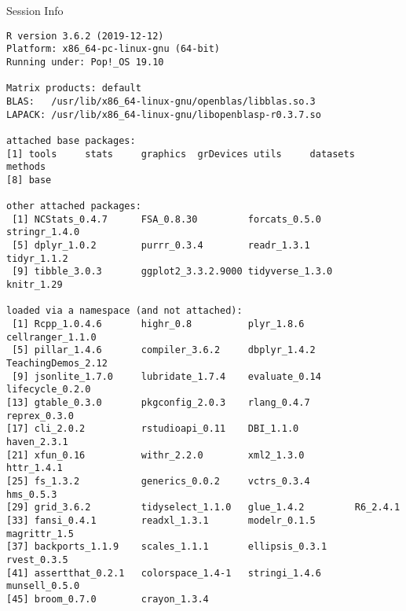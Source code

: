 \documentclass[10pt]{beamer}\usepackage[]{graphicx}\usepackage[]{color}
\makeatletter
\newenvironment{kframe}{%
 \def\at@end@of@kframe{}%
 \ifinner\ifhmode%
  \def\at@end@of@kframe{\end{minipage}}%
  \begin{minipage}{\columnwidth}%
 \fi\fi%
 \def\FrameCommand##1{\hskip\@totalleftmargin \hskip-\fboxsep
 \colorbox{shadecolor}{##1}\hskip-\fboxsep
     \hskip-\linewidth \hskip-\@totalleftmargin \hskip\columnwidth}%
 \MakeFramed {\advance\hsize-\width
   \@totalleftmargin\z@ \linewidth\hsize
   \@setminipage}}%
 {\par\unskip\endMakeFramed%
 \at@end@of@kframe}
\newenvironment{knitrout}{}{} %
\makeatother
\begin{document}
	
	
	\begin{frame}[fragile]{Session Info}
		\tiny
		
\begin{knitrout}\tiny
{}\color{fgcolor}\begin{kframe}
\begin{verbatim}
R version 3.6.2 (2019-12-12)
Platform: x86_64-pc-linux-gnu (64-bit)
Running under: Pop!_OS 19.10

Matrix products: default
BLAS:   /usr/lib/x86_64-linux-gnu/openblas/libblas.so.3
LAPACK: /usr/lib/x86_64-linux-gnu/libopenblasp-r0.3.7.so

attached base packages:
[1] tools     stats     graphics  grDevices utils     datasets  methods  
[8] base     

other attached packages:
 [1] NCStats_0.4.7      FSA_0.8.30         forcats_0.5.0      stringr_1.4.0     
 [5] dplyr_1.0.2        purrr_0.3.4        readr_1.3.1        tidyr_1.1.2       
 [9] tibble_3.0.3       ggplot2_3.3.2.9000 tidyverse_1.3.0    knitr_1.29        

loaded via a namespace (and not attached):
 [1] Rcpp_1.0.4.6       highr_0.8          plyr_1.8.6         cellranger_1.1.0  
 [5] pillar_1.4.6       compiler_3.6.2     dbplyr_1.4.2       TeachingDemos_2.12
 [9] jsonlite_1.7.0     lubridate_1.7.4    evaluate_0.14      lifecycle_0.2.0   
[13] gtable_0.3.0       pkgconfig_2.0.3    rlang_0.4.7        reprex_0.3.0      
[17] cli_2.0.2          rstudioapi_0.11    DBI_1.1.0          haven_2.3.1       
[21] xfun_0.16          withr_2.2.0        xml2_1.3.0         httr_1.4.1        
[25] fs_1.3.2           generics_0.0.2     vctrs_0.3.4        hms_0.5.3         
[29] grid_3.6.2         tidyselect_1.1.0   glue_1.4.2         R6_2.4.1          
[33] fansi_0.4.1        readxl_1.3.1       modelr_0.1.5       magrittr_1.5      
[37] backports_1.1.9    scales_1.1.1       ellipsis_0.3.1     rvest_0.3.5       
[41] assertthat_0.2.1   colorspace_1.4-1   stringi_1.4.6      munsell_0.5.0     
[45] broom_0.7.0        crayon_1.3.4      
\end{verbatim}
\end{kframe}
\end{knitrout}
		
	\end{frame}
	
\end{document}
